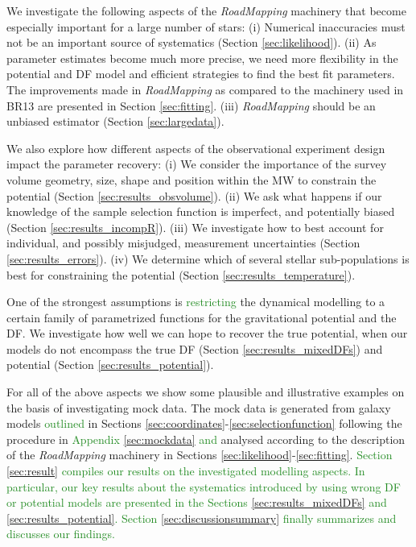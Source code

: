 \documentclass[iop,revtex4]{emulateapj}
\newcommand{\RM}{{\sl RoadMapping}}
\newcommand{\NEW}[1]{\textcolor{ForestGreen}{#1}}
\newcommand{\OLD}[1]{}
\begin{document}
We investigate the following aspects of the \RM{} machinery that become especially important for a large number of stars: (i) Numerical inaccuracies must not be an important source of systematics (Section \ref{sec:likelihood}). (ii) As parameter estimates become much more precise, we need more flexibility in the potential and DF model and efficient strategies to find the best fit parameters. The improvements made in \RM{} as compared to the machinery used in BR13 are presented in Section \ref{sec:fitting}. (iii) \RM{} should be an unbiased estimator (Section \ref{sec:largedata}).

We also explore how different aspects of the observational experiment design impact the parameter recovery: (i) We consider the importance of the survey volume geometry, size, shape and position within the MW to constrain the potential (Section \ref{sec:results_obsvolume}). (ii) We ask what happens if our knowledge of the sample selection function is imperfect, and potentially biased (Section \ref{sec:results_incompR}). (iii) We investigate how to best account for individual, and possibly misjudged, measurement uncertainties (Section \ref{sec:results_errors}). (iv) We determine which of several stellar sub-populations is best for constraining the potential (Section \ref{sec:results_temperature}). 

One of the strongest assumptions is \OLD{to restrict}\NEW{restricting} the dynamical modelling to a certain family of parametrized functions for the gravitational potential and the DF. We investigate how well we can hope to recover the true potential, when our models do not encompass the true DF (Section \ref{sec:results_mixedDFs}) and potential (Section \ref{sec:results_potential}).

For all of the above aspects we show some plausible and illustrative examples on the basis of investigating mock data. The mock data is generated from galaxy models \OLD{presented}\NEW{outlined} in Sections \ref{sec:coordinates}-\ref{sec:selectionfunction} following the procedure in \OLD{Section}\NEW{Appendix} \ref{sec:mockdata}\OLD{, }\NEW{ and }analysed according to the description of the \RM{} machinery in Sections \ref{sec:likelihood}-\ref{sec:fitting}. \OLD{The results on the investigated modelling aspects are presented in Section \ref{sec:results} and summarized and discussed in Section \ref{sec:discussionsummary}.}\NEW{Section \ref{sec:result} compiles our results on the investigated modelling aspects. In particular, our key results about the systematics introduced by using wrong DF or potential models are presented in the Sections \ref{sec:results_mixedDFs} and \ref{sec:results_potential}. Section \ref{sec:discussionsummary} finally summarizes and discusses our findings.}
\end{document}
